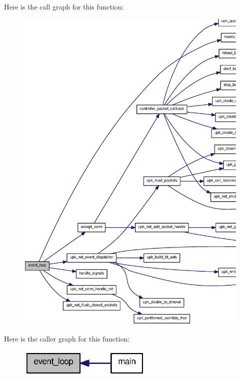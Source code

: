 Here is the call graph for this function:\nopagebreak
\begin{figure}[H]
\begin{center}
\leavevmode
\includegraphics[width=400pt]{controller_8h_afcb5edca8881b0c26ccbc120775ed38b_cgraph}
\end{center}
\end{figure}




Here is the caller graph for this function:\nopagebreak
\begin{figure}[H]
\begin{center}
\leavevmode
\includegraphics[width=182pt]{controller_8h_afcb5edca8881b0c26ccbc120775ed38b_icgraph}
\end{center}
\end{figure}


